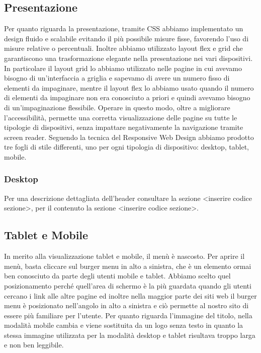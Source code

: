 \documentclass[a4paper]{article}
\begin{document}
    \subsection{Presentazione}
    Per quanto riguarda la presentazione, tramite CSS abbiamo implementato un design fluido e scalabile evitando il più possibile misure fisse, favorendo l’uso di misure relative o percentuali. Inoltre abbiamo utilizzato layout flex e grid che garantiscono una trasformazione elegante nella presentazione nei vari dispositivi. In particolare il layout grid lo abbiamo utilizzato nelle pagine in cui avevamo bisogno di un’interfaccia a griglia e sapevamo di avere un numero fisso di elementi da impaginare, mentre il layout flex lo abbiamo usato quando il numero di elementi da impaginare non era conosciuto a priori e quindi avevamo bisogno di un’impaginazione flessibile. Operare in questo modo, oltre a migliorare l’accessibilità, permette una corretta visualizzazione delle pagine su tutte le tipologie di dispositivi, senza impattare negativamente la navigazione tramite screen reader. Seguendo la tecnica del Responsive Web Design abbiamo prodotto tre fogli di stile differenti, uno per ogni tipologia di dispositivo: desktop, tablet, mobile.

    \subsubsection{Desktop}
    Per una descrizione dettagliata dell’header consultare la sezione <inserire codice sezione>, per il contenuto la sezione <inserire codice sezione>.

    \subsection{Tablet e Mobile}
    In merito alla visualizzazione tablet e mobile, il menù è nascosto. Per aprire il menù, basta cliccare sul burger menu in alto a sinistra, che è un elemento ormai ben conosciuto da parte degli utenti mobile e tablet. Abbiamo scelto quel posizionamento perché quell’area di schermo è la più guardata quando gli utenti cercano i link alle altre pagine ed inoltre nella maggior parte dei siti web il burger menu è posizionato nell'angolo in alto a sinistra e ciò permette al nostro sito di essere più familiare per l’utente. Per quanto riguarda l’immagine del titolo, nella modalità mobile cambia e viene sostituita da un logo senza testo in quanto la stessa immagine utilizzata per la modalità desktop e tablet risultava troppo larga e non ben leggibile.
\end{document}
